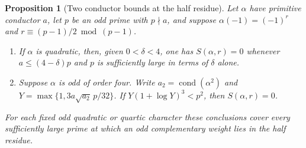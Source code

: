 \documentclass[a4paper,11pt]{article}
\newtheorem{proposition}{Proposition}[section]
\theoremstyle{definition}
\theoremstyle{remark}
\numberwithin{equation}{section}
\begin{document}
\begin{proposition}[Two conductor bounds at the half residue]
\leavevmode\label{prop:quarticconductor539}
Let \(\alpha\) have primitive conductor \(a\), let \(p\) be
an odd prime with \(p\nmid a\), and suppose
\(\alpha(-1)=(-1)^r\) and \(r\equiv(p-1)/2\bmod(p-1)\).
\begin{enumerate}
\item If \(\alpha\) is quadratic, then, given \(0<\delta<4\),
one has \(S(\alpha,r)=0\) whenever \(a\le(4-\delta)p\) and
\(p\) is sufficiently large in terms of \(\delta\) alone.
\item Suppose \(\alpha\) is odd of order four. Write
\(a_2=\operatorname{cond}(\alpha^2)\) and
\(Y=\max\{1,3a\sqrt{a_2}\,p/32\}\).
If \(Y(1+\log Y)^3<p^2\), then \(S(\alpha,r)=0\).
\end{enumerate}
For each fixed odd quadratic or quartic character these
conclusions cover every sufficiently large prime at which an
odd complementary weight lies in the half residue.
\end{proposition}
\end{document}
